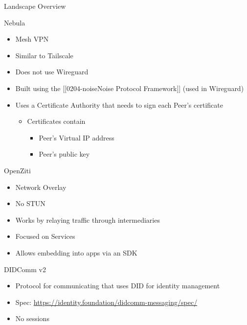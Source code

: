 \begin{frame}[fragile]{Landscape Overview}
\begin{block}{Nebula}
\protect\hypertarget{nebula}{}
\begin{itemize}
\tightlist
\item
  Mesh VPN
\item
  Similar to Tailscale
\item
  Does not use Wireguard
\item
  Built using the {[}{[}0204-noise\textbar Noise Protocol
  Framework{]}{]} (used in Wireguard)
\item
  Uses a Certificate Authority that needs to sign each Peer's
  certificate

  \begin{itemize}
  \tightlist
  \item
    Certificates contain

    \begin{itemize}
    \tightlist
    \item
      Peer's Virtual IP address
    \item
      Peer's public key
    \end{itemize}
  \end{itemize}
\end{itemize}
\end{block}

\begin{block}{OpenZiti}
\protect\hypertarget{openziti}{}
\begin{itemize}
\tightlist
\item
  Network Overlay
\item
  No STUN
\item
  Works by relaying traffic through intermediaries
\item
  Focused on Services
\item
  Allows embedding into apps via an SDK
\end{itemize}
\end{block}

\begin{block}{DIDComm v2}
\protect\hypertarget{didcomm-v2}{}
\begin{itemize}
\item
  Protocol for communicating that uses DID for identity management
\item
  Spec: \url{https://identity.foundation/didcomm-messaging/spec/}
\item
  No sessions


\end{itemize}
\end{block}
\end{frame}
